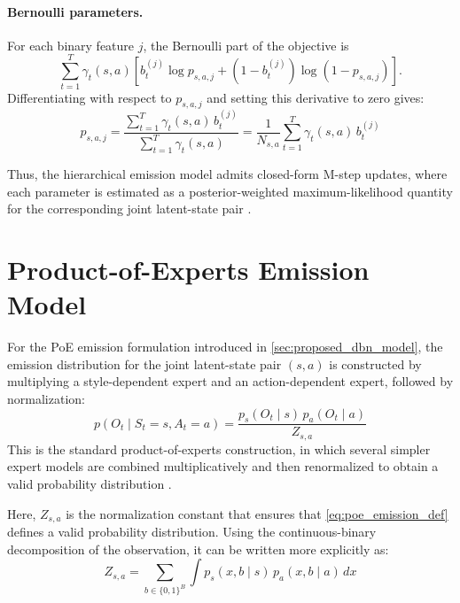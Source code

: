 \paragraph{Bernoulli parameters.}
For each binary feature \(j\), the Bernoulli part of the objective is
\begin{equation}
\sum_{t=1}^{T}
\gamma_t(s,a)
\left[
b_t^{(j)}\log p_{s,a,j}
+
(1-b_t^{(j)})\log(1-p_{s,a,j})
\right].
\end{equation}
Differentiating with respect to \(p_{s,a,j}\) and setting this derivative to zero gives:
\begin{equation}
p_{s,a,j}
=
\frac{\sum_{t=1}^{T}\gamma_t(s,a)\,b_t^{(j)}}
{\sum_{t=1}^{T}\gamma_t(s,a)}
=
\frac{1}{N_{s,a}}
\sum_{t=1}^{T}\gamma_t(s,a)\,b_t^{(j)}
\label{eq:hier_bernoulli_update}
\end{equation}

Thus, the hierarchical emission model admits closed-form M-step updates, 
where each parameter is estimated as a posterior-weighted maximum-likelihood quantity for the corresponding joint latent-state pair \cite{Dempster1977,Bilmes1998}.




\section{Product-of-Experts Emission Model}
\label{app:poe_emission}

For the \ac{PoE} emission formulation introduced in \autoref{sec:proposed_dbn_model}, 
the emission distribution for the joint latent-state pair \((s,a)\) is constructed by 
multiplying a style-dependent expert and an action-dependent expert, followed by normalization:
\begin{equation}
p(O_t \mid S_t=s,A_t=a)
=
\frac{p_s(O_t \mid s)\,p_a(O_t \mid a)}{Z_{s,a}}
\label{eq:poe_emission_def}
\end{equation}
This is the standard product-of-experts construction, in which several simpler expert models 
are combined multiplicatively and then renormalized to obtain a valid probability distribution 
\cite{Hinton2002}.

Here, \(Z_{s,a}\) is the normalization constant that ensures that
\eqref{eq:poe_emission_def} defines a valid probability distribution. Using the
continuous-binary decomposition of the observation, it can be written more explicitly as:
\begin{equation}
Z_{s,a}
=
\sum_{b \in \{0,1\}^{B}}
\int
p_s(x,b \mid s)\,p_a(x,b \mid a)\,dx
\end{equation}

